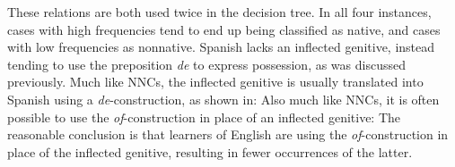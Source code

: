 \documentclass[main.tex]{subfiles}
\begin{document}
These relations are both used twice in the decision tree. In all four instances, cases with high frequencies tend to end up being classified as native, and cases with low frequencies as nonnative. Spanish lacks an inflected genitive, instead tending to use the preposition \textit{de} to express possession, as was discussed previously. Much like NNCs, the inflected genitive is usually translated into Spanish using a \textit{de}-construction, as shown in:
Also much like NNCs, it is often possible to use the \textit{of}-construction in place of an inflected genitive:
The reasonable conclusion is that learners of English are using the \textit{of}-construction in place of the inflected genitive, resulting in fewer occurrences of the latter.

\end{document}
